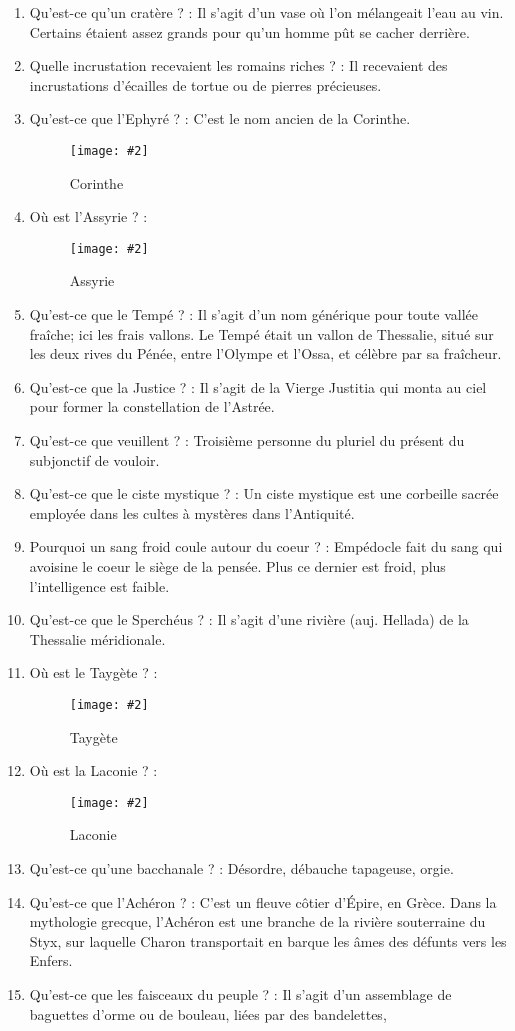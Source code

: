 \documentclass[a4paper, 11pt, hidelinks]{article}
\newcommand{\img}[4]{\begin{figure}[!ht]
    \centering
    \texttt{[image: \#2]}
    \caption{#3}
    \label{#4}
    \end{figure} }
\begin{document}
\begin{enumerate}
      \item Qu'est-ce qu'un cratère ? : Il s'agit d'un vase où l'on mélangeait l'eau au vin. Certains étaient assez grands pour
            qu'un homme pût se cacher derrière.
      \item Quelle incrustation recevaient les romains riches ? : Il recevaient des incrustations d'écailles de tortue ou de pierres précieuses.
      \item Qu'est-ce que l'Ephyré ? : C'est le nom ancien de la Corinthe.
            \img{0.3}{Corinthe.png}{Corinthe}{101}
      \item Où est l'Assyrie ? : 
            \img{0.3}{Assyrie.jpg}{Assyrie}{102}
      \item Qu'est-ce que le Tempé ? : Il s'agit d'un nom générique pour toute vallée fraîche; ici les frais vallons. Le Tempé était un vallon de Thessalie, situé
            sur les deux rives du Pénée, entre l'Olympe et l'Ossa, et célèbre par sa fraîcheur.
      \item Qu'est-ce que la Justice ? : Il s'agit de la Vierge Justitia qui monta au ciel pour former la constellation de l'Astrée.
      \item Qu'est-ce que veuillent ? : Troisième personne du pluriel du présent du subjonctif de vouloir.
      \item Qu'est-ce que le ciste mystique ? : Un ciste mystique est une corbeille sacrée employée dans les cultes à mystères dans l'Antiquité.
      \item Pourquoi un sang froid coule autour du coeur ? : Empédocle fait du sang qui avoisine le coeur le siège de la pensée.
            Plus ce dernier est froid, plus l'intelligence est faible.
      \item Qu'est-ce que le Sperchéus ? : Il s'agit d'une rivière (auj. Hellada) de la Thessalie méridionale.
      \item Où est le Taygète ? :
            \img{0.3}{Taygete.png}{Taygète}{103}
      \item Où est la Laconie ? :
            \img{0.45}{Laconie.png}{Laconie}{104}
      \item Qu'est-ce qu'une bacchanale ? : Désordre, débauche tapageuse, orgie.
      \item Qu'est-ce que l'Achéron ? : C'est un fleuve côtier d'Épire, en Grèce. Dans la mythologie grecque, l'Achéron est une branche de la rivière souterraine du Styx, 
            sur laquelle Charon transportait en barque les âmes des défunts vers les Enfers.
      \item Qu'est-ce que les faisceaux du peuple ? : Il s'agit d'un assemblage de baguettes d'orme ou de bouleau, liées par des bandelettes,

\end{enumerate}
\end{document}
